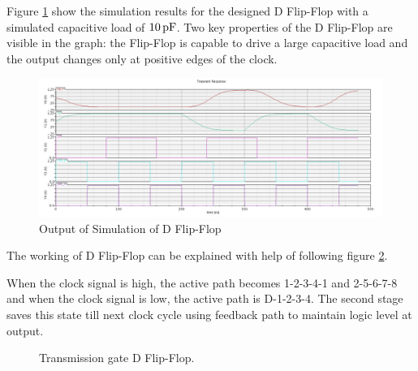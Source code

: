 \documentclass[parskip,oneside,colorbacktitle,10pt,accentcolor=tud1b,table]{tudreport}
\begin{document}
{Figure \ref{fig:dff_sim} show the simulation results for the designed D Flip-Flop with a simulated capacitive load of $\unit[10]{pF}$. Two key properties of the D Flip-Flop are visible in the graph: the Flip-Flop is capable to drive a large capacitive load and the output changes only at positive edges of the clock.

\begin{figure}[H]
	\begin{center}
		\includegraphics[scale=0.50]{DFlip-Flop_testbench_output}
        \caption{Output of Simulation of D Flip-Flop}
        \label{fig:dff_sim}	
	\end{center}
\end{figure}

The working of D Flip-Flop can be explained with help of following figure \ref{fig:dff_explanation}.

When the clock signal is high, the active path becomes 1-2-3-4-1 and 2-5-6-7-8 and when the clock signal is low, the active path is D-1-2-3-4. The second stage saves this state till next clock cycle using feedback path to maintain logic level at output.

\begin{figure}[H]
     \begin{center}
        \caption{Transmission gate D Flip-Flop.}
        \label{fig:dff_explanation}
    \end{center}
\end{figure}

}
\end{document}
